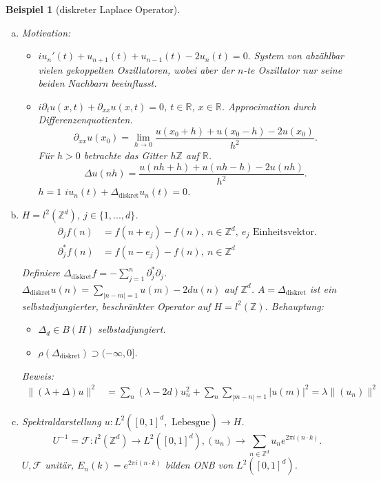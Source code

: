 \documentclass[12pt]{extreport} %
\newtheorem{Beispiel}[Satz]{Beispiel}
\numberwithin{equation}{section}
\newcommand{\R}{\mathbb{R}} %
\newcommand{\Z}{\mathbb{Z}} %
\newcommand{\F}{\mathcal{F}}
\newcommand{\m}{\cdot}
\newcommand{\Bew}{\emph{Beweis: }}
\newcommand{\laplace}{\Delta}
\begin{document}
	\begin{Beispiel}[diskreter Laplace Operator]
		~
		\begin{enumerate}[a)]
			\item Motivation:
			\begin{itemize}
				\item $i u_n'(t) + u_{n+1}(t) + u_{n-1}(t) - 2 u_n(t) = 0.$
				System von abzählbar vielen gekoppelten Oszillatoren, wobei aber der $n$-te Oszillator nur seine beiden Nachbarn beeinflusst.
				\item $i\partial_t u(x,t) +\partial_{xx}u(x,t) = 0$, $t\in \R$, $x\in \R$. Approcimation durch Differenzenquotienten. 
				$$\partial_{xx}u(x_0) = \lim\limits_{h\rightarrow 0} \frac{u(x_0+h)+u(x_0-h)-2u(x_0)}{h^2}.$$
				Für $h>0$ betrachte das Gitter $h\Z$ auf $\R$.
				$$\laplace u(nh) = \frac{u(nh+h)+u(nh-h)-2u(nh)}{h^2}.$$
				$h = 1$ $iu_n(t) + \laplace_{\text{diskret}}u_n(t) = 0$.
			\end{itemize}
				\item $H = l^2(\Z^d)$, $j\in \{1,...,d\}$.
				\begin{align*}
					\partial_j f(n)&= f(n+e_j)-f(n), ~n\in \Z^d, ~e_j\text{ Einheitsvektor}.\\
					\partial_j^*f(n) &= f(n - e_j)-f(n) ,~ n\in \Z^d\\
				\end{align*}
				Definiere $\laplace_{\text{diskret}}f = -\sum_{j = 1}^{n}\partial_j^* \partial_j$. $\laplace_{\text{diskret}}u(n) = \sum_{|n-m| = 1} u(m) - 2 du(n)$ auf $\Z^d$. $A = \laplace_{\text{diskret}}$ ist ein selbstadjungierter, beschränkter Operator auf $H = l^2(\Z)$. Behauptung: 
				\begin{itemize}
					\item $\laplace_d\in B(H)$ selbstadjungiert.
					\item $\rho(\laplace_{\text{diskret}})\supset (-\infty, 0]$.
				\end{itemize}
				\Bew 
				\begin{align*}
					\|(\lambda +\laplace) u\|^2 &= \sum_n (\lambda-2d)u_n^2 +\sum_n\sum_{|m-n|= 1}|u(m)|^2 = \lambda\|(u_n)\|^2
				\end{align*}
			\item Spektraldarstellung $u: L^2([0,1]^d,\text{ Lebesgue})\rightarrow H$.
			$$U^{-1} = \F: l^2(\Z^d)\rightarrow L^2([0,1]^d), (u_n)\rightarrow\sum_{n\in \Z^d}u_n e^{2\pi i (n\m k)}.$$
			$U,\F$ unitär, $E_n(k) = e^{2\pi i(n\m k)}$ bilden ONB von $L^2([0,1]^d)$.
			

\end{enumerate}
\end{Beispiel}
\end{document}
